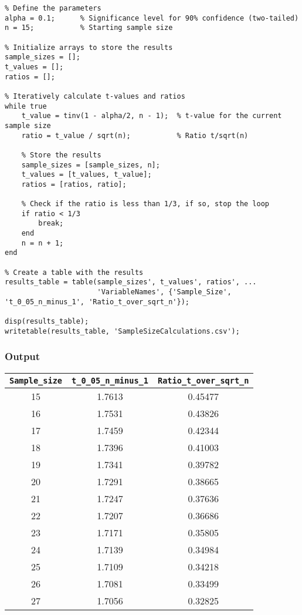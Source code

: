 \documentclass[12pt]{article}
\begin{document}
\begin{multicols}{2}
\begin{lstlisting}
% Define the parameters
alpha = 0.1;      % Significance level for 90% confidence (two-tailed)
n = 15;           % Starting sample size

% Initialize arrays to store the results
sample_sizes = [];
t_values = [];
ratios = [];

% Iteratively calculate t-values and ratios
while true
    t_value = tinv(1 - alpha/2, n - 1);  % t-value for the current sample size
    ratio = t_value / sqrt(n);           % Ratio t/sqrt(n)
    
    % Store the results
    sample_sizes = [sample_sizes, n];
    t_values = [t_values, t_value];
    ratios = [ratios, ratio];
    
    % Check if the ratio is less than 1/3, if so, stop the loop
    if ratio < 1/3
        break;
    end
    n = n + 1;
end

% Create a table with the results
results_table = table(sample_sizes', t_values', ratios', ...
                      'VariableNames', {'Sample_Size', 't_0_05_n_minus_1', 'Ratio_t_over_sqrt_n'});

disp(results_table);
writetable(results_table, 'SampleSizeCalculations.csv');
\end{lstlisting}
\end{multicols}

\subsubsection*{Output}
\begin{center}
\begin{tabular}{|c|c|c|}
\hline \texttt{Sample\_size} & \texttt{t\_0\_05\_n\_minus\_1} & \texttt{Ratio\_t\_over\_sqrt\_n} \\
\hline 15 & 1.7613 & 0.45477 \\
\hline 16 & 1.7531 & 0.43826 \\
\hline 17 & 1.7459 & 0.42344 \\
\hline 18 & 1.7396 & 0.41003 \\
\hline 19 & 1.7341 & 0.39782 \\
\hline 20 & 1.7291 & 0.38665 \\
\hline 21 & 1.7247 & 0.37636 \\
\hline 22 & 1.7207 & 0.36686 \\
\hline 23 & 1.7171 & 0.35805 \\
\hline 24 & 1.7139 & 0.34984 \\
\hline 25 & 1.7109 & 0.34218 \\
\hline 26 & 1.7081 & 0.33499 \\
\hline 27 & 1.7056 & 0.32825 \\
\hline
\end{tabular}
\end{center}
\end{document}
